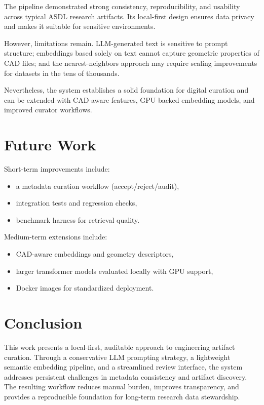 \documentclass[12pt]{article}
\begin{document}
The pipeline demonstrated strong consistency, reproducibility, and usability across typical ASDL research artifacts. Its local-first design ensures data privacy and makes it suitable for sensitive environments.

However, limitations remain. LLM-generated text is sensitive to prompt structure; embeddings based solely on text cannot capture geometric properties of CAD files; and the nearest-neighbors approach may require scaling improvements for datasets in the tens of thousands.

Nevertheless, the system establishes a solid foundation for digital curation and can be extended with CAD-aware features, GPU-backed embedding models, and improved curator workflows.

\section{Future Work}

Short-term improvements include:
\begin{itemize}
    \item a metadata curation workflow (accept/reject/audit),
    \item integration tests and regression checks,
    \item benchmark harness for retrieval quality.
\end{itemize}

Medium-term extensions include:
\begin{itemize}
    \item CAD-aware embeddings and geometry descriptors,
    \item larger transformer models evaluated locally with GPU support,
    \item Docker images for standardized deployment.
\end{itemize}

\section{Conclusion}

This work presents a local-first, auditable approach to engineering artifact curation. Through a conservative LLM prompting strategy, a lightweight semantic embedding pipeline, and a streamlined review interface, the system addresses persistent challenges in metadata consistency and artifact discovery. The resulting workflow reduces manual burden, improves transparency, and provides a reproducible foundation for long-term research data stewardship.
\end{document}
